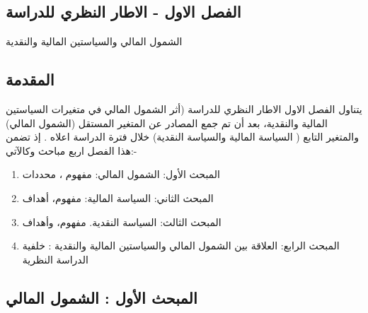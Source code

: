 \documentclass[10pt,a4paper]{report}
\begin{document}
\begin{doublespacing}
\chapter{الفصل الاول - الاطار النظري للدراسة}
\thispagestyle{empty}
\pagestyle{basicstyle}
\begin{center}
\Huge{الشمول المالي والسياستين المالية والنقدية}
\end{center}
	\fontsize{14}{16}\selectfont
\newpage
\section*{المقدمة}
يتناول الفصل الاول الاطار النظري للدراسة (أثر الشمول المالي في متغيرات السياستين المالية والنقدية، بعد أن تم جمع المصادر عن المتغير المستقل (الشمول المالي) والمتغير التابع ( السياسة المالية والسياسة النقدية)  خلال فترة الدراسة اعلاه .
إذ تضمن هذا الفصل اربع مباحث وكالآتي:-
\begin{enumerate}
	\item المبحث الأول: الشمول المالي:  مفهوم ، محددات
	\item المبحث الثاني: السياسة المالية: مفهوم، أهداف 
	\item المبحث الثالث: السياسة النقدية. مفهوم، وأهداف
	\item المبحث الرابع: العلاقة بين الشمول المالي  والسياستين المالية والنقدية : خلفية الدراسة النظرية
\end{enumerate}
\section{المبحث الأول : الشمول المالي}

\end{doublespacing}
\end{document}
